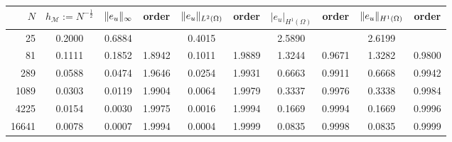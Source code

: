 \begin{tabular}{rccccccccc}
    \hline
    $N$ & $h_\mathcal{M}:=N^{-\frac{1}{2}}$ & $\lVert e_u\rVert_\infty$ & order & 
    $\lVert e_u\rVert_{L^2(\Omega)}$ & order & $|e_u|_{H^1(\Omega)}$ & order &
    $\lVert e_u\rVert_{H^1(\Omega)}$ & order \Tstrut\Bstrut \\
    \hline
       25    &0.2000    &0.6884    &          &0.4015    &          &2.5890    &          &2.6199    &      \Tstrut\\
       81    &0.1111    &0.1852    &1.8942    &0.1011    &1.9889    &1.3244    &0.9671    &1.3282    &0.9800\\
      289    &0.0588    &0.0474    &1.9646    &0.0254    &1.9931    &0.6663    &0.9911    &0.6668    &0.9942\\
     1089    &0.0303    &0.0119    &1.9904    &0.0064    &1.9979    &0.3337    &0.9976    &0.3338    &0.9984\\
     4225    &0.0154    &0.0030    &1.9975    &0.0016    &1.9994    &0.1669    &0.9994    &0.1669    &0.9996\\
    16641    &0.0078    &0.0007    &1.9994    &0.0004    &1.9999    &0.0835    &0.9998    &0.0835    &0.9999\Bstrut\\
    \hline
\end{tabular}
